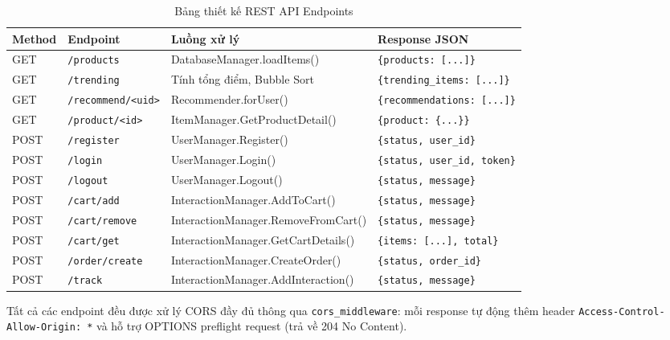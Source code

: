 \documentclass{report}
\begin{document}
\begin{table}[H]
    \centering
    \small
    \renewcommand{\arraystretch}{1.4}
    \begin{tabularx}{\textwidth}{|l|l|>{\raggedright\arraybackslash}X|l|}
        \hline
        \textbf{Method} & \textbf{Endpoint} & \textbf{Luồng xử lý} & \textbf{Response JSON} \\ \hline
        GET & \texttt{/products} & DatabaseManager.loadItems() & \texttt{\{products: [...]\}} \\ \hline
        GET & \texttt{/trending} & Tính tổng điểm, Bubble Sort & \texttt{\{trending\_items: [...]\}} \\ \hline
        GET & \texttt{/recommend/<uid>} & Recommender.forUser() & \texttt{\{recommendations: [...]\}} \\ \hline
        GET & \texttt{/product/<id>} & ItemManager.GetProductDetail() & \texttt{\{product: \{...\}\}} \\ \hline
        POST & \texttt{/register} & UserManager.Register() & \texttt{\{status, user\_id\}} \\ \hline
        POST & \texttt{/login} & UserManager.Login() & \texttt{\{status, user\_id, token\}} \\ \hline
        POST & \texttt{/logout} & UserManager.Logout() & \texttt{\{status, message\}} \\ \hline
        POST & \texttt{/cart/add} & InteractionManager.AddToCart() & \texttt{\{status, message\}} \\ \hline
        POST & \texttt{/cart/remove} & InteractionManager.RemoveFromCart() & \texttt{\{status, message\}} \\ \hline
        POST & \texttt{/cart/get} & InteractionManager.GetCartDetails() & \texttt{\{items: [...], total\}} \\ \hline
        POST & \texttt{/order/create} & InteractionManager.CreateOrder() & \texttt{\{status, order\_id\}} \\ \hline
        POST & \texttt{/track} & InteractionManager.AddInteraction() & \texttt{\{status, message\}} \\ \hline
    \end{tabularx}
    \caption{Bảng thiết kế REST API Endpoints}
    \label{tab:api_design}
\end{table}

Tất cả các endpoint đều được xử lý CORS đầy đủ thông qua \texttt{cors\_middleware}: mỗi response tự động thêm header \texttt{Access-Control-Allow-Origin: *} và hỗ trợ OPTIONS preflight request (trả về 204 No Content).
\end{document}
